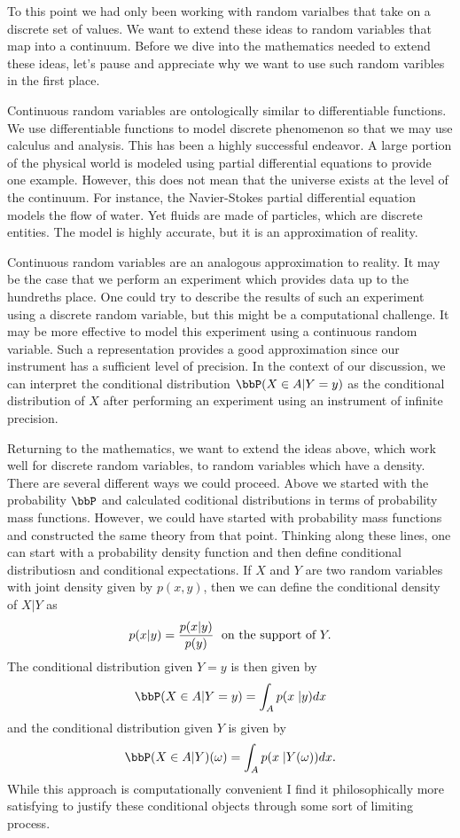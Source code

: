 \documentclass{report}
\begin{document}
To this point we had only been working with random varialbes that take on a discrete set of values.  We want to extend these ideas to random variables that map into a continuum.  Before we dive into the mathematics needed to extend these ideas, let's pause and appreciate why we want to use such random varibles in the first place.

Continuous random variables are ontologically similar to differentiable functions.  We use differentiable functions to model discrete phenomenon so that we may use calculus and analysis.  This has been a highly successful endeavor.  A large portion of the physical world is modeled using partial differential equations to provide one example.  However, this does not mean that the universe exists at the level of the continuum.  For instance, the Navier-Stokes partial differential equation models the flow of water.  Yet fluids are made of particles, which are discrete entities.  The model is highly accurate, but it is an approximation of reality.

Continuous random variables are an analogous approximation to reality.  It may be the case that we perform an experiment which provides data up to the hundreths place.  One could try to describe the results of such an experiment using a discrete random variable, but this might be a computational challenge.  It may be more effective to model this experiment using a continuous random variable.  Such a representation provides a good approximation since our instrument has a sufficient level of precision.  In the context of our discussion, we can interpret the conditional distribution $\bbP(X \in A | Y = y)$ as the conditional distribution of $X$ after performing an experiment using an instrument of infinite precision.

Returning to the mathematics, we want to extend the ideas above, which work well for discrete random variables, to random variables which have a density.  There are several different ways we could proceed.  Above we started with the probability $\bbP$ and calculated coditional distributions in terms of probability mass functions.  However, we could have started with probability mass functions and constructed the same theory from that point.  Thinking along these lines, one can start with a probability density function and then define conditional distributiosn and conditional expectations.  If $X$ and $Y$ are two random variables with joint density given by $p(x,y)$, then we can define the conditional density of $X|Y$ as
\[
p(x|y) = \frac{p(x|y)}{p(y)} \; \textmd{ on the support of } Y.
\]
The conditional distribution given $Y=y$ is then given by
\[
\bbP(X \in A | Y = y) = \int_A p(x \; |y) dx
\]
and the conditional distribution given $Y$ is given by
\[
\bbP(X \in A | Y)(\omega) = \int_A p(x \; |Y(\omega)) dx.
\] 
While this approach is computationally convenient I find it philosophically more satisfying to justify these conditional objects through some sort of limiting process.
\end{document}
